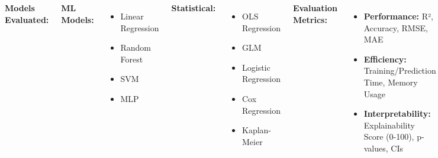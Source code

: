 \documentclass[25pt, a0paper, portrait]{tikzposter}
\begin{document}
\begin{columns}
{\vspace{0.5cm}
\textbf{Models Evaluated:}
\begin{columns}[T, totalwidth=\textwidth]
\textcolor{mlcolor}{\textbf{ML Models:}}
\begin{itemize}[leftmargin=*]
    \item Linear Regression
    \item Random Forest
    \item SVM
    \item MLP
\end{itemize}
\textcolor{statcolor}{\textbf{Statistical:}}
\begin{itemize}[leftmargin=*]
    \item OLS Regression
    \item GLM
    \item Logistic Regression
    \item Cox Regression
    \item Kaplan-Meier
\end{itemize}
\end{columns}

\vspace{0.5cm}
\textbf{Evaluation Metrics:}
\begin{itemize}[leftmargin=*]
    \item \textbf{Performance:} R², Accuracy, RMSE, MAE
    \item \textbf{Efficiency:} Training/Prediction Time, Memory Usage
    \item \textbf{Interpretability:} Explainability Score (0-100), p-values, CIs
\end{itemize}
}




\end{columns}
\end{document}
